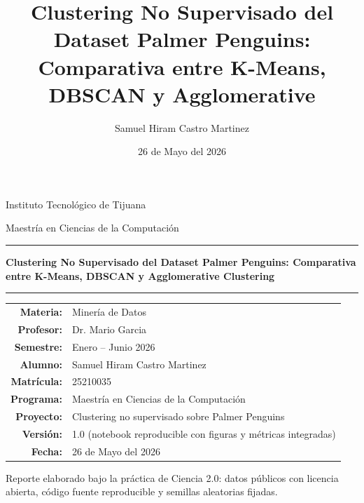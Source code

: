 \documentclass[12pt,letterpaper]{article}
\title{Clustering No Supervisado del Dataset Palmer Penguins: Comparativa entre K-Means, DBSCAN y Agglomerative}
\author{Samuel Hiram Castro Martinez}
\date{26 de Mayo del 2026}
\begin{document}
\begin{titlepage}
  \centering
  {\Large Instituto Tecnológico de Tijuana\par}
  \vspace{0.4cm}
  {\large Maestría en Ciencias de la Computación\par}
  \vspace{1.6cm}
  {\color{dmTeal}\rule{0.7\linewidth}{1pt}\par}
  \vspace{0.8cm}
  {\LARGE\bfseries Clustering No Supervisado del Dataset Palmer Penguins: Comparativa entre K-Means, DBSCAN y Agglomerative Clustering\par}
  \vspace{0.4cm}
  {\color{dmTeal}\rule{0.7\linewidth}{1pt}\par}
  \vspace{1.6cm}
  \begin{tabularx}{0.92\textwidth}{>{\bfseries}r X}
    Materia: & Minería de Datos\\
    Profesor: & Dr. Mario Garcia\\
    Semestre: & Enero -- Junio 2026\\
    Alumno: & Samuel Hiram Castro Martinez\\
    Matrícula: & 25210035\\
    Programa: & Maestría en Ciencias de la Computación\\
    Proyecto: & Clustering no supervisado sobre Palmer Penguins\\
    Versión: & 1.0 (notebook reproducible con figuras y métricas integradas)\\
    Fecha: & 26 de Mayo del 2026
  \end{tabularx}
  \vfill
  \small\color{dmMuted} Reporte elaborado bajo la práctica de Ciencia 2.0: datos públicos con licencia abierta, código fuente reproducible y semillas aleatorias fijadas.\par
\end{titlepage}



\tableofcontents
\listoffigures
\listoftables
\newpage








\appendix


\end{document}
